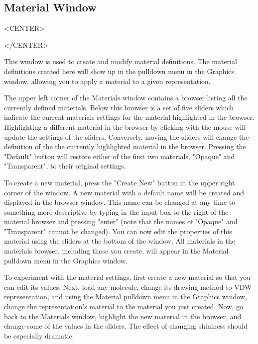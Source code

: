 
\subsection{Material Window}
\label{ug:ui:window:material}

\begin{rawhtml}
<CENTER>
\end{rawhtml}
\begin{rawhtml}
</CENTER>
\end{rawhtml}

This window is used to create and modify material definitions.  The material
definitions created here will show up in the pulldown menu in the Graphics
window, allowing you to apply a material to a given representation.  

The upper left corner of the Materials window contains a browser listing all the
currently defined materials.  Below this browser is a set of five sliders which
indicate the current materials settings for the material highlighted in the
browser.  Highlighting a different material in the browser by clicking with the
mouse will update the settings of the sliders.  Conversely, moving the sliders
will change the definition of the the currently highlighted material in the
browser.  Pressing the "Default" button will restore either of the first two
materials, "Opaque" and "Transparent", to their original settings.

To create a new material, press the "Create New" button in the upper right
corner of the window.  A new material with a default name will be created and
displayed in the browser window.  This name can be changed at any time to
something more descriptive by typing in the input box to the right of the
material browser and pressing "enter" (note that the names of "Opaque" and
"Transparent" cannot be changed).  You can now edit the properties of this
material using the sliders at the bottom of the window.  All materials in the
materials browser, including those you create, will appear in the Material
pulldown menu in the Graphics window. 

To experiment with the material settings, first create a new material so
that you can edit its values.  Next, load any molecule, change its 
drawing method to VDW representation, and using the Material pulldown menu
in the Graphics window, change the representation's material to the 
material you just created.  Now, go back to the Materials window, highlight
the new material in the browser, and change some of the values in the sliders.
The effect of changing shininess should be especially dramatic.

